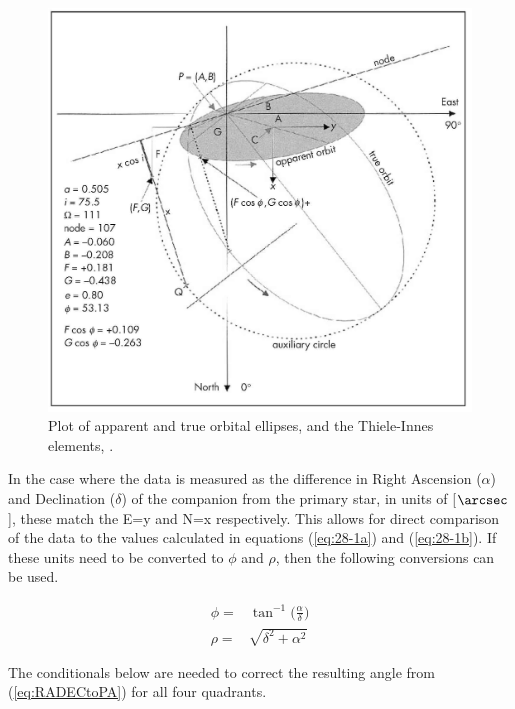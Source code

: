 \documentclass[12pt,preprint]{aastex}
\begin{document}
\begin{figure}[ht]
\begin{center}
\includegraphics[scale=0.9]{Argyle-oribit-plots2-cropped.jpg}
\caption[Apparent and True orbital ellipses]{ Plot of apparent and true orbital ellipses, and the Thiele-Innes elements, \citet{Argyle}. }
\label{fig:apparentTrueEllipses}
\end{center}
\end{figure}

In the case where the data is measured as the difference in Right Ascension ($\alpha$) and Declination ($\delta$) of the companion from the primary star, in units of [$\arcsec$], these match the E=y and N=x respectively.  This allows for direct comparison of the data to the values calculated in equations  (\ref{eq:28-1a}) and (\ref{eq:28-1b}).  If these units need to be converted to $\phi$ and $\rho$, then the following conversions can be used.

\begin{subequations}
\begin{align}\label{eq:RADECtoPA}
\phi =&   \tan^{-1}\bigg(\frac{\alpha}{\delta} \bigg)\\
\label{eq:RADECtoSA}
\rho =&   \sqrt{\delta^2+\alpha^2}
\end{align}
\end{subequations}

The conditionals below are needed to correct the resulting angle from (\ref{eq:RADECtoPA}) for all four quadrants.
\end{document}
